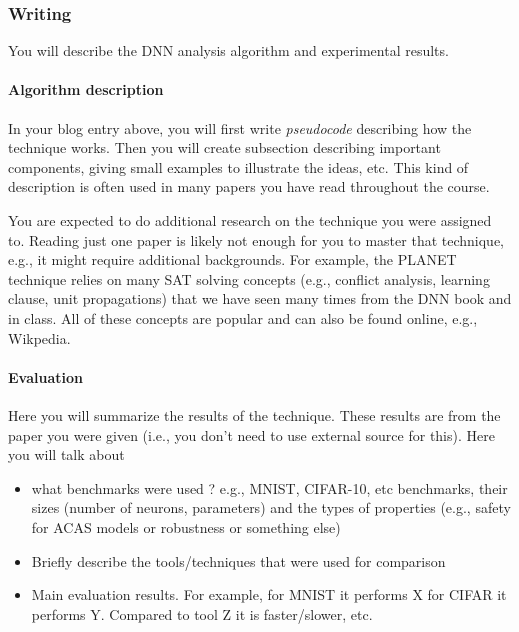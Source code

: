 \documentclass[11pt]{article}
\begin{document}


\subsubsection{Writing}
You will describe the DNN analysis algorithm and experimental results.

\paragraph{Algorithm description} In your blog entry above, you will first write \emph{pseudocode} describing how the technique works.  Then you will create subsection describing important components, giving small examples to illustrate the ideas, etc.  This kind of description is often used in many papers you have read throughout the course.  

You are expected to do additional research on the technique you were assigned to. Reading just one paper is likely not enough for you to master that technique, e.g., it might require additional backgrounds.  For example, the PLANET technique relies on many SAT solving concepts (e.g., conflict analysis, learning clause, unit propagations) that we have seen many times from the DNN book and in class.  All of these concepts are popular and can also be found online, e.g., Wikpedia. 

\paragraph{Evaluation} Here you will summarize the results of the technique. These results are from the paper you were given (i.e., you don't need to use external source for this). Here you will talk about
\begin{itemize}
    \item what benchmarks were used ?  e.g.,  MNIST, CIFAR-10, etc benchmarks, their sizes (number of neurons, parameters)  and the types of properties (e.g., safety for ACAS models or robustness or something else)
    \item Briefly describe the tools/techniques that were used for comparison
    \item Main evaluation results.  For example, for MNIST it performs X for CIFAR it performs Y.  Compared to tool Z it is faster/slower, etc.
\end{itemize}
\end{document}
